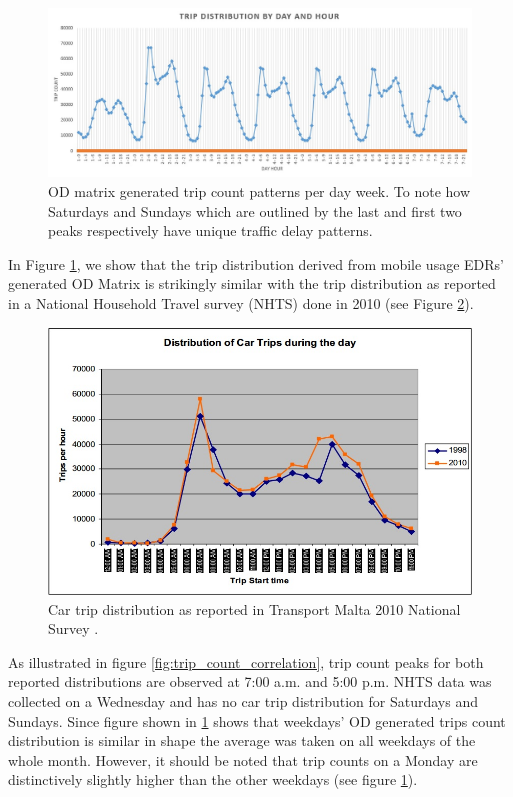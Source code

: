 \documentclass[12pt, a4paper]{report}
\theoremstyle{definition}
\theoremstyle{definition}%
\theoremstyle{definition}%
\theoremstyle{definition}%
\theoremstyle{definition}%
\theoremstyle{definition}%
\begin{document}
\begin{figure}[!]	
	\includegraphics[scale=0.5]{Trip_delay_per_day_week.jpg}
	\centering
	\caption[OD matrix generated trip count]{OD matrix generated trip count patterns per day week. To note how Saturdays and Sundays which are outlined by the last and first two peaks respectively have unique traffic delay patterns.}
	\label{fig:trip_distribution}
\end{figure}


In Figure \ref{fig:trip_distribution}, we show that the trip distribution derived from mobile usage EDRs' generated OD Matrix is strikingly similar with the trip distribution as reported in a National Household Travel survey (NHTS) done in 2010 \cite{malta2011national} (see Figure \ref{fig:trip_distribution_nso}). 


\begin{figure}[!]	
	\includegraphics[scale=0.6]{Transport_malta_trip_distribution.jpg}
	\centering
	\caption[NHTS car trip distribution]{Car trip distribution as reported in Transport Malta 2010 National Survey \cite{malta2011national}.}
	\label{fig:trip_distribution_nso}
\end{figure}

As illustrated in figure \ref{fig:trip_count_correlation}, trip count peaks for both reported distributions are observed at 7:00 a.m. and 5:00 p.m. NHTS data was collected on a Wednesday and has no car trip distribution for Saturdays and Sundays. Since figure shown in \ref{fig:trip_distribution} shows that weekdays' OD generated trips count distribution is similar in shape the average was taken on all weekdays of the whole month. However, it should be noted that trip counts on a Monday are distinctively slightly higher than the other weekdays (see figure \ref{fig:trip_distribution}). 
\end{document}
